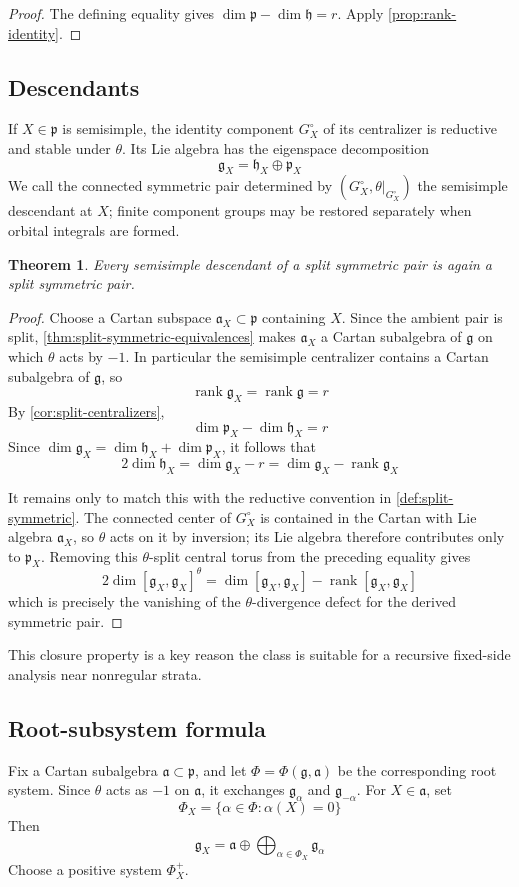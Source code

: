 \documentclass[11pt]{amsart}
\newtheorem{theorem}{Theorem}[section]
\theoremstyle{definition}
\theoremstyle{remark}
\newcommand{\rank}{\operatorname{rank}}
\newcommand{\g}{\mathfrak g}
\newcommand{\h}{\mathfrak h}
\newcommand{\p}{\mathfrak p}
\newcommand{\aA}{\mathfrak a}
\begin{document}
\begin{proof}
The defining equality gives $\dim\p-\dim\h=r$.  Apply
\cref{prop:rank-identity}.
\end{proof}



\subsection{Descendants}
If $X\in\p$ is semisimple, the identity component $G_X^\circ$ of its
centralizer is reductive and stable under $\theta$.  Its Lie algebra has the
eigenspace decomposition
\[
 \g_X=\h_X\oplus\p_X
\]
We call the connected symmetric pair determined by
$(G_X^\circ,\theta|_{G_X^\circ})$ the semisimple descendant at $X$; finite
component groups may be restored separately when orbital integrals are
formed.

\begin{theorem}\label{thm:descendants-split}
Every semisimple descendant of a split symmetric pair is again a split symmetric pair.
\end{theorem}

\begin{proof}
Choose a Cartan subspace $\aA_X\subset\p$ containing $X$.  Since the ambient
pair is split, \cref{thm:split-symmetric-equivalences} makes
$\aA_X$ a Cartan subalgebra of $\g$ on which $\theta$ acts by $-1$.  In
particular the semisimple centralizer contains a Cartan subalgebra of $\g$, so
\[
 \rank\g_X=\rank\g=r
\]
By \cref{cor:split-centralizers},
\[
 \dim\p_X-\dim\h_X=r
\]
Since $\dim\g_X=\dim\h_X+\dim\p_X$, it follows that
\[
 2\dim\h_X=\dim\g_X-r
 =\dim\g_X-\rank\g_X
\]

It remains only to match this with the reductive convention in
\cref{def:split-symmetric}.  The connected center of $G_X^\circ$ is contained
in the Cartan with Lie algebra $\aA_X$, so $\theta$ acts on it by inversion;
its Lie algebra therefore contributes only to $\p_X$.  Removing this $\theta$-split central torus from the preceding equality gives
\[
 2\dim [\g_X,\g_X]^\theta
 =\dim [\g_X,\g_X]-\rank [\g_X,\g_X]
\]
which is precisely the vanishing of the $\theta$-divergence defect for the
derived symmetric pair.
\end{proof}

This closure property is a key reason the class is suitable for a recursive
fixed-side analysis near nonregular strata.

\subsection{Root-subsystem formula}
Fix a Cartan subalgebra $\aA\subset\p$, and let
$\Phi=\Phi(\g,\aA)$ be the corresponding root system.  Since
$\theta$ acts as $-1$ on $\aA$, it exchanges $\g_\alpha$ and $\g_{-\alpha}$.
For $X\in\aA$, set
\[
 \Phi_X=\{\alpha\in\Phi:\alpha(X)=0\}
\]
Then
\[
 \g_X=\aA\oplus\bigoplus_{\alpha\in\Phi_X}\g_\alpha
\]
Choose a positive system $\Phi_X^+$.
\end{document}
